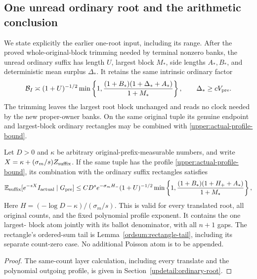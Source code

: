 \subsection{One unread ordinary root and the arithmetic conclusion}
\label{upper:root-section}

We state explicitly the earlier one-root input, including its range.
After the proved whole-original-block trimming needed by terminal
nonzero banks, the unread ordinary suffix has length $U$, largest
block $M_*$, side lengths $A_*,B_*$, and deterministic mean surplus
$\Delta_*$.  It retains the same intrinsic ordinary factor
\begin{equation}
 \mathcal B_I\asymp
 (1+U)^{-1/2}\min\left\{1,
 \frac{(1+B_*)(1+\Delta_*+A_*)}{1+M_*}\right\},
 \qquad \Delta_*\geq cV_{\rm pre}.
 \label{upper:ordinary-factor}
\end{equation}
The trimming leaves the largest root block unchanged and reads no
clock needed by the new proper-owner banks.  On the same original
tuple its genuine endpoint and largest-block ordinary rectangles may
be combined with \eqref{upper:actual-profile-bound}.

\begin{proposition}
\label{upper:root-contract}
Let $D>0$ and $\kappa$ be arbitrary original-prefix-measurable numbers,
and write $X=\kappa+(\sigma_m/s)Z_{\rm suffix}$.  If the same tuple
has the profile \eqref{upper:actual-profile-bound}, its combination
with the ordinary suffix rectangles satisfies
\begin{equation}
 \mathbb E_{\rm suffix}[e^{-sX}I_{\rm actual}\mid G_{\rm pre}]
 \leq C D^s e^{-\sigma_m H_-}(1+U)^{-1/2}
 \min\left\{1,
 \frac{(1+B_*)(1+H_++A_*)}{1+M_*}\right\},
 \label{upper:root-bound}
\end{equation}
Here $H=(-\log D-\kappa)/(\sigma_m/s)$.
This is valid for every translated root, all original counts, and
the fixed polynomial profile exponent.  It contains the one largest-
block atom jointly with its ballot denominator, with all $n+1$ gaps.
The rectangle's ordered-sum tail is Lemma~\ref{ordsum:rectangle-tail},
including its separate count-zero case.
No additional Poisson atom is to be appended.
\end{proposition}
\begin{proof}
The same-count layer calculation, including every translate and the
polynomial outgoing profile, is given in Section~\ref{updetail:ordinary-root}.
\end{proof}

